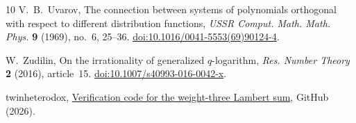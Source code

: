 \documentclass[11pt,letterpaper]{article}
\numberwithin{equation}{section}
\begin{document}
\begin{thebibliography}{10}
V.~B.~Uvarov, The connection between systems of polynomials orthogonal
with respect to different distribution functions,
\emph{USSR Comput. Math. Math. Phys.} \textbf{9} (1969), no.~6, 25--36.
\href{https://doi.org/10.1016/0041-5553(69)90124-4}{doi:10.1016/0041-5553(69)90124-4}.

W.~Zudilin, On the irrationality of generalized \(q\)-logarithm,
\emph{Res. Number Theory} \textbf{2} (2016), article~15.
\href{https://doi.org/10.1007/s40993-016-0042-x}{doi:10.1007/s40993-016-0042-x}.

twinheterodox, \href{https://github.com/twinheterodox/algebraic-base-lambert-values}{Verification code for the weight-three Lambert sum}, GitHub (2026).
\end{thebibliography}
\end{document}
